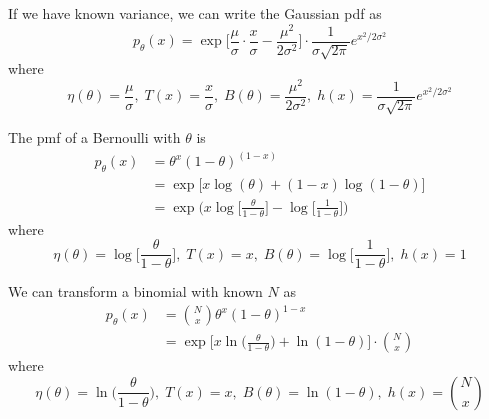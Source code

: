   \begin{example}
    \label{ex:gaussian-with-known-variance}
    If we have known variance, we can write the Gaussian pdf as 
    \begin{equation}
      p_\theta (x) = \exp \bigg[ \frac{\mu}{\sigma} \cdot \frac{x}{\sigma} - \frac{\mu^2}{2 \sigma^2} \bigg] \cdot \frac{1}{\sigma \sqrt{2\pi}} e^{x^2/2 \sigma^2}
    \end{equation}
    where 
    \begin{equation}
      \eta(\theta) = \frac{\mu}{\sigma}, \; T(x) = \frac{x}{\sigma}, \; B(\theta) = \frac{\mu^2}{2 \sigma^2}, \; h(x) = \frac{1}{\sigma \sqrt{2 \pi}} e^{x^2/2 \sigma^2}
    \end{equation}
  \end{example}

  \begin{example}[Bernoulli]
    \label{ex:bernoulli}
  The pmf of a Bernoulli with $\theta$ is 
  \begin{align*}
      p_\theta (x) & = \theta^x (1 - \theta)^{(1 - x)} \\
      & = \exp \big[x \log (\theta) + (1 - x)\log(1 - \theta) \big] \\
      & = \exp \bigg( x \log \Big[ \frac{\theta}{1 - \theta} \Big] - \log \Big[ \frac{1}{1 - \theta} \Big] \bigg)
  \end{align*}
  where 
  \begin{equation}
    \eta(\theta) = \log \Big[ \frac{\theta}{1 - \theta} \Big], \; T(x) = x, \; B(\theta) = \log \Big[ \frac{1}{1 - \theta} \Big], \; h(x) = 1
  \end{equation}
  \end{example}


  \begin{example}
    \label{ex:binomial-with-known-number-of-trials}
  We can transform a binomial with known $N$ as 
  \begin{align*}
    p_\theta (x) &  = \binom{N}{x} \theta^x  (1 - \theta)^{1 - x} \\
                 & = \exp \bigg[ x \ln \big( \frac{\theta}{1 - \theta} \Big) + \ln(1 - \theta) \bigg] \cdot \binom{N}{x} 
  \end{align*}
  where 
    \begin{equation}
      \eta (\theta) = \ln \big( \frac{\theta}{1 - \theta} \Big), \; T(x) = x, \; B(\theta) = \ln(1 - \theta), \; h(x) = \binom{N}{x}
    \end{equation}
  \end{example}

